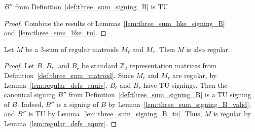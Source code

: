 \begin{lemma}\label{lem:three_sum_signing_B_tu}
    $B''$ from Definition~\ref{def:three_sum_signing_B} is TU.
\end{lemma}

\begin{proof}
    Combine the results of Lemmas~\ref{lem:three_sum_like_signing_B} and~\ref{lem:three_sum_like_tu}.
\end{proof}

\begin{lemma}\label{lem:matroid_three_sum_reg}
    Let $M$ be a $3$-sum of regular matroids $M_{\ell}$ and $M_{r}$. Then $M$ is also regular.
\end{lemma}

\begin{proof}
    Let $B$, $B_{\ell}$, and $B_{r}$ be standard $\mathbb{Z}_{2}$ representation matrices from Definition~\ref{def:three_sum_matroid}. Since $M_{\ell}$ and $M_{r}$ are regular, by Lemma~\ref{lem:regular_defs_equiv}, $B_{\ell}$ and $B_{r}$ have TU signings. Then the canonical signing $B''$ from Definition~\ref{def:three_sum_signing_B} is a TU signing of $B$. Indeed, $B''$ is a signing of $B$ by Lemma~\ref{lem:three_sum_signing_B_valid}, and $B''$ is TU by Lemma~\ref{lem:three_sum_signing_B_tu}. Thus, $M$ is regular by Lemma~\ref{lem:regular_defs_equiv}.
\end{proof}
